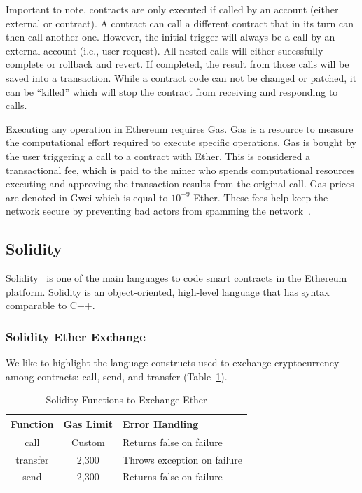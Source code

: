 \documentclass[10pt,conference]{IEEEtran}
\begin{document}
Important to note, contracts are only executed if called by an account (either external or contract). A contract can call a different contract that in its turn can then call another one. However, the initial trigger will always be a call by an external account (i.e., user request). All nested calls will either sucessfully complete or rollback and revert. If completed, the result from those calls will be saved into a transaction. While a contract code can not be changed or patched, it can be ``killed'' which will stop the contract from receiving and responding to calls.

Executing any operation in Ethereum requires Gas. Gas is a resource to measure the computational effort required to execute specific operations. Gas is bought by the user triggering a call to a contract with Ether. This is considered a transactional fee, which is paid to the miner who spends computational resources executing and approving the transaction results from the original call. Gas prices are denoted in Gwei which is equal to $10^{-9}$ Ether. These fees help keep the network secure by preventing bad actors from spamming the network~\cite{docs}.


\subsection{Solidity}

Solidity~\cite{solidity} is one of the main languages to code smart contracts in the Ethereum platform. Solidity is an object-oriented, high-level language that has syntax comparable to C++.

\subsubsection{Solidity Ether Exchange}\label{sec:sol-ether-exchange}

We like to highlight the language constructs used to exchange cryptocurrency among contracts: call, send, and transfer (Table~\ref{tab:freq}).

\begin{table}[h]
\center
  \caption{Solidity Functions to Exchange Ether}
  \label{tab:freq}
  \begin{tabular}{ccl}
    \hline
    Function & Gas Limit & Error Handling\\
    \hline
    call & Custom & Returns false on failure\\
    transfer & 2,300 & Throws exception on failure\\
    send & 2,300 & Returns false on failure\\
  \hline
\end{tabular}
\end{table}
\end{document}
